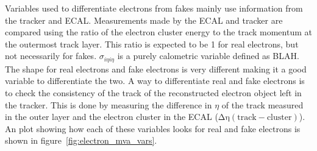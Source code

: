 Variables used to differentiate electrons from fakes mainly use information from the tracker and ECAL.
Measurements made by the ECAL and tracker are compared using the ratio of the electron cluster energy to the track momentum at the outermost track layer.
This ratio is expected to be 1 for real electrons, but not necessarily for fakes.
$\sigma_{i\eta i\eta}$ is a purely calometric variable defined as BLAH.
The shape for real electrons and fake electrons is very different making it a good variable to differentiate the two.
A way to differentiate real and fake electrons is to check the consistency of the track of the reconstructed electron object left in the tracker.
This is done by measuring the difference in $\eta$ of the track measured in the outer layer and the electron cluster in the ECAL ($\mathrm{\Delta\eta(track-cluster)}$).
An plot showing how each of these variables looks for real and fake electrons is shown in figure~\ref{fig:electron_mva_vars}.

